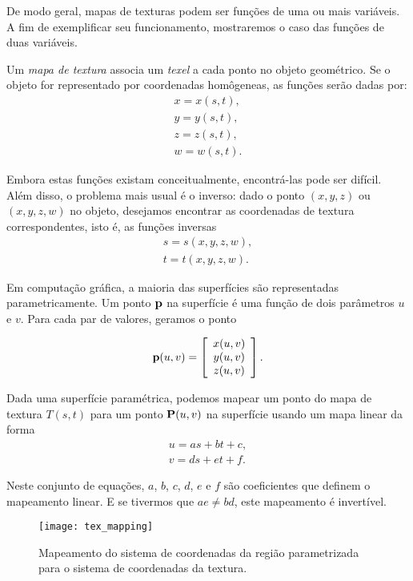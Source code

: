 De modo geral, mapas de texturas podem ser funções de uma ou mais variáveis. A fim de exemplificar seu funcionamento, mostraremos o caso das funções de duas variáveis.

Um \emph{mapa de textura} associa um {\it texel} a cada ponto no objeto geométrico. Se o objeto for representado por coordenadas homôgeneas, as funções serão dadas por:
\[
	\begin{array}{l}
	x = x(s, t), \\
	y = y(s, t), \\
	z = z(s, t), \\
	w = w(s, t).
	\end{array}
\]

Embora estas funções existam conceitualmente, encontrá-las pode ser difícil. Além disso, o problema mais usual é o inverso: dado o ponto $(x,y,z)$ ou $(x, y, z, w)$ no objeto, desejamos encontrar as coordenadas de textura correspondentes, isto é, as funções inversas 
\[
\begin{array}{l}
s = s(x, y, z, w), \\
t = t(x, y, z, w).
\end{array}
\]

Em computação gráfica, a maioria das superfícies são representadas parametricamente. Um ponto ${\bf p}$ na superfície é uma função de dois parâmetros $u$ e $v$. Para cada par de valores, geramos o ponto

\[
{\bf p}(u,v) = \left[ \begin{array}{c} x(u,v) \\ y(u,v) \\ z(u,v) \end{array} \right].
\]    

Dada uma superfície paramétrica, podemos mapear um ponto do mapa de textura $T(s,t)$ para um ponto ${\bf P}(u,v)$ na superfície usando um mapa linear da forma
\[ \begin{array}{l}
 u = as + bt + c, \\
 v = ds + et + f.
 \end{array}
\]

Neste conjunto de equações, $a$, $b$, $c$, $d$, $e$ e $f$ são coeficientes que definem o mapeamento linear. E se tivermos que $ae \neq bd$, este mapeamento é invertível. 

\begin{figure}[!htb]
\center
\texttt{[image: tex\_mapping]}
\caption{Mapeamento do sistema de coordenadas da região parametrizada para o sistema de coordenadas da textura.}
\label{tex_map}
\end{figure}

